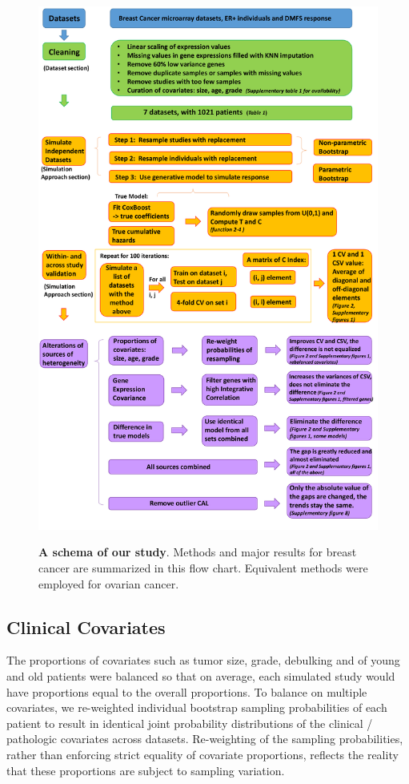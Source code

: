 \documentclass{bioinfo}
\begin{document}
\begin{figure}[htp]
    \centering
    \includegraphics[width=12.5cm]{schema_update_new.pdf}\\
    \caption{\textbf{A schema of our study}. Methods and major results for breast cancer are summarized in this flow chart. Equivalent methods were employed for ovarian cancer. }
    \label{scheme}
  \end{figure}

  \subsection{Clinical Covariates}

  The proportions of covariates such as tumor size, grade, debulking and of young and old
  patients were balanced so that on average, each simulated study would have
  proportions equal to the overall proportions.  To
  balance on multiple covariates, we re-weighted individual bootstrap
  sampling probabilities of each patient to result in identical joint
  probability distributions of the clinical / pathologic covariates
  across datasets.  Re-weighting of the sampling probabilities, rather
  than enforcing strict equality of covariate proportions, reflects
  the reality that these proportions are subject to sampling
  variation.
\end{document}
